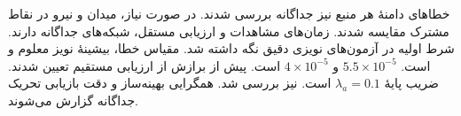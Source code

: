 خطاهای دامنهٔ هر منبع نیز جداگانه بررسی شدند.
در صورت نیاز، میدان و نیرو در نقاط مشترک مقایسه شدند.
زمان‌های مشاهدات و ارزیابی مستقل، شبکه‌های جداگانه دارند.
شرط اولیه در آزمون‌های نویزی دقیق نگه داشته شد.
مقیاس خطا، بیشینهٔ نویز معلوم و  است.
 $5.5\times10^{-5}$ و  $4\times10^{-5}$ است.
 پیش از برازش از ارزیابی مستقیم تعیین شدند.
ضریب پایهٔ  $\lambda_a=0.1$ است.
 نیز بررسی شد.
همگرایی بهینه‌ساز و دقت بازیابی تحریک جداگانه گزارش می‌شوند.

